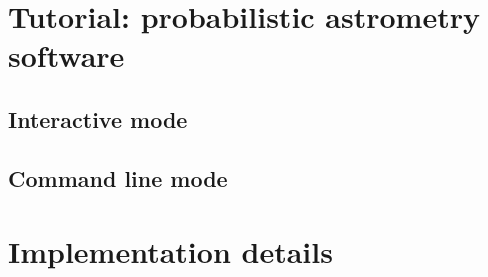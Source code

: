 \documentclass[manuscript]{aastex}
\begin{document}



\appendix

\section{Tutorial: probabilistic astrometry software}
\subsection{Interactive mode}
\subsection{Command line mode}

\section{Implementation details}
\end{document}
